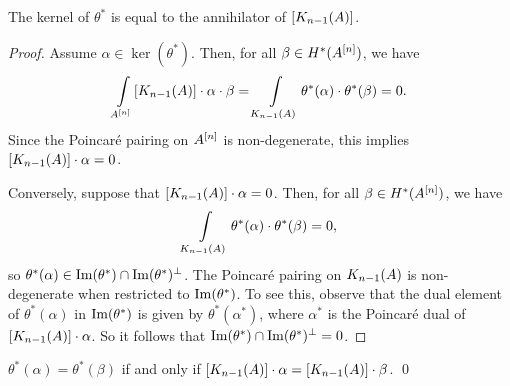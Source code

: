 \begin{proposition}
The kernel of $\theta^*$ is equal to the annihilator of $[\kum{A}{n-1}]$.
\end{proposition}
\begin{proof}
Assume $\alpha\in \ker(\theta^*)$. Then, for all $\beta \in H^*(A\hilb{n})$, we have
$$
\int\limits_{A\hilb{n}} [\kum{A}{n-1}]\cdot \alpha \cdot \beta = \int\limits_{\kum{A}{n-1}}\theta^*(\alpha)\cdot\theta^*(\beta) = 0.
$$
Since the Poincar\'e pairing on $A\hilb{n}$ is non-degenerate, this implies $ [\kum{A}{n-1}]\cdot \alpha=0$. 

Conversely, suppose that $ [\kum{A}{n-1}]\cdot \alpha=0$. Then, for all $\beta \in H^*(A\hilb{n})$, we have 
$$
\int\limits_{\kum{A}{n-1}}\theta^*(\alpha)\cdot\theta^*(\beta) = 0,
$$
so $\theta^*(\alpha) \in \im(\theta^*)\cap\im(\theta^*)^\perp$. The Poincar\'e pairing on $\kum{A}{n-1}$ is non-degenerate when restricted to $\im(\theta^*)$. To see this, observe that the dual element of $\theta^*(\alpha)$ in $\im(\theta^*)$ is given by $\theta^*(\alpha^*)$, where $\alpha^* $ is the Poincar\'e dual of $[\kum{A}{n-1}]\cdot \alpha$. So it follows that $\im(\theta^*)\cap\im(\theta^*)^\perp=0$.
\end{proof}
\begin{corollary} \label{KummerEquality}
$\theta^*(\alpha) = \theta^*(\beta)$ if and only if $[\kum{A}{n-1}]\cdot \alpha = [\kum{A}{n-1}]\cdot \beta$. 
\qed
\end{corollary}

